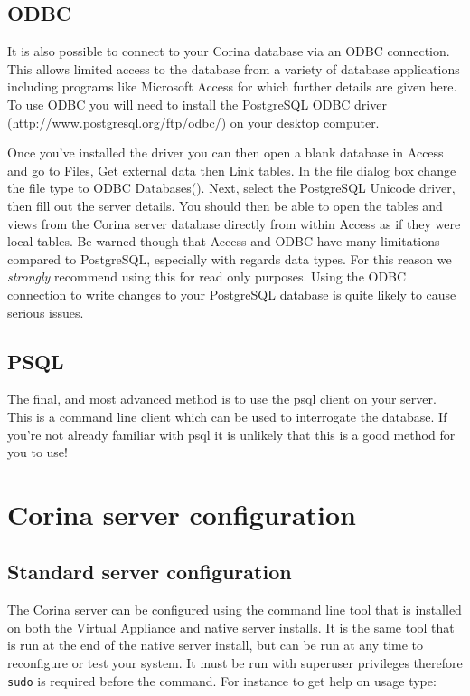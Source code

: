 \subsection{ODBC}
It is also possible to connect to your Corina database via an ODBC connection.  This allows limited access to the database from a variety of database applications including programs like Microsoft Access for which further details are given here.   To use ODBC you will need to install the PostgreSQL ODBC driver (\url{http://www.postgresql.org/ftp/odbc/}) on your desktop computer.

Once you've installed the driver you can then open a blank database in Access and go to Files, Get external data then Link tables.  In the file dialog box change the file type to ODBC Databases().  Next, select the PostgreSQL Unicode driver, then fill out the server details.  You should then be able to open the tables and views from the Corina server database directly from within Access as if they were local tables.  Be warned though that Access and ODBC have many limitations compared to PostgreSQL, especially with regards data types.  For this reason we \emph{strongly} recommend using this for read only purposes.  Using the ODBC connection to write changes to your PostgreSQL database is quite likely to cause serious issues. 

\subsection{PSQL}
The final, and most advanced method is to use the psql client on your server.  This is a command line client which can be used to interrogate the database.  If you're not already familiar with psql it is unlikely that this is a good method for you to use!


\section{Corina server configuration}
\label{txt:serverConfig}
\subsection{Standard server configuration}
The Corina server can be configured using the command line tool that is installed on both the Virtual Appliance and native server installs.  It is the same tool that is run at the end of the native server install, but can be run at any time to reconfigure or test your system.  It must be run with superuser privileges therefore \verb|sudo| is required before the command.  For instance to get help on usage type:

